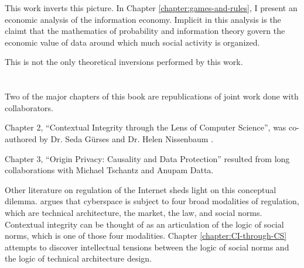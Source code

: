 \documentclass[../thesis.tex]{subfiles}
\begin{document}
 This work inverts this picture.
 In Chapter \ref{chapter:games-and-rules}, I present
 an economic analysis of the information economy.
 Implicit in this analysis is the claimt that
 the mathematics of probability and information theory
 govern the economic value of data around which much
 social activity is organized.

 This is not the only theoretical inversions performed by this
 work.
 
 

 
 
 \section{}

 Two of the major chapters of this book are republications of joint work
 done with collaborators.

 Chapter 2, ``Contextual Integrity through the Lens of Computer Science'',
 was co-authored by Dr. Seda G{\"u}rses and Dr. Helen Nissenbaum \cite{benthall2017contextual}.

 Chapter 3, ``Origin Privacy: Causality and Data Protection'' resulted from
 long collaborations with Michael Tschantz and Anupam Datta. 



 
 

 
 Other literature on regulation of the Internet sheds
 light on this conceptual dilemma.
 \citet{lessig2009code} argues that
 cyberspace is subject to four broad modalities of regulation,
 which are technical architecture, the market, the law, and
 social norms.
 Contextual integrity can be thought of as an articulation
 of the logic of social norms, which is one of those four modalities.
 Chapter \ref{chapter:CI-through-CS} attempts to discover intellectual
 tensions between the logic of social norms and the logic of technical
 architecture design.


 
\end{document}
